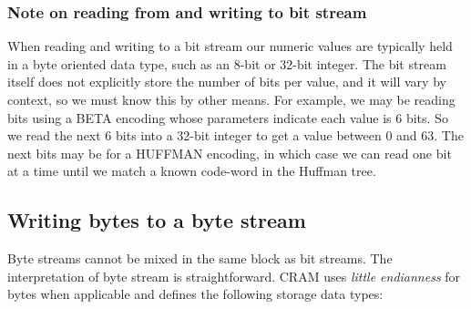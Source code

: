 \documentclass[a4paper]{article}
\begin{document}
\subsubsection*{Note on reading from and writing to bit stream}

When reading and writing to a bit stream our numeric values are
typically held in a byte oriented data type, such as an 8-bit or
32-bit integer.
The bit stream itself does not explicitly store the number of bits
per value, and it will vary by context, so we must know this by other means.
For example, we may be reading bits using a BETA encoding whose parameters
indicate each value is 6 bits.
So we read the next 6 bits into a 32-bit integer to get a value
between 0 and 63.
The next bits may be for a HUFFMAN encoding, in which case we can read one
bit at a time until we match a known code-word in the Huffman tree.

\subsection{\textbf{Writing bytes to a byte stream}}
\label{subsec:writing-bytes}

Byte streams cannot be mixed in the same block as bit streams.
The interpretation of byte stream is straightforward.
CRAM uses \emph{little endianness} for bytes when applicable and
defines the following storage data types:
\end{document}
